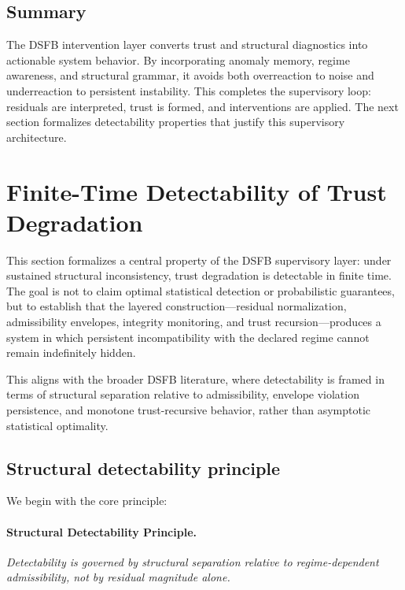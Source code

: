 \documentclass[11pt]{article}
\theoremstyle{definition}
\theoremstyle{plain}
\begin{document}

\subsection{Summary}

The DSFB intervention layer converts trust and structural diagnostics into actionable system behavior. By incorporating anomaly memory, regime awareness, and structural grammar, it avoids both overreaction to noise and underreaction to persistent instability. This completes the supervisory loop: residuals are interpreted, trust is formed, and interventions are applied. The next section formalizes detectability properties that justify this supervisory architecture.



\section{Finite-Time Detectability of Trust Degradation}
\label{sec:detectability}

This section formalizes a central property of the DSFB supervisory layer: under sustained structural inconsistency, trust degradation is detectable in finite time. The goal is not to claim optimal statistical detection or probabilistic guarantees, but to establish that the layered construction—residual normalization, admissibility envelopes, integrity monitoring, and trust recursion—produces a system in which persistent incompatibility with the declared regime cannot remain indefinitely hidden.

This aligns with the broader DSFB literature, where detectability is framed in terms of structural separation relative to admissibility, envelope violation persistence, and monotone trust-recursive behavior, rather than asymptotic statistical optimality. 


\subsection{Structural detectability principle}

We begin with the core principle:

\paragraph{Structural Detectability Principle.}
\emph{Detectability is governed by structural separation relative to regime-dependent admissibility, not by residual magnitude alone.}
\end{document}

